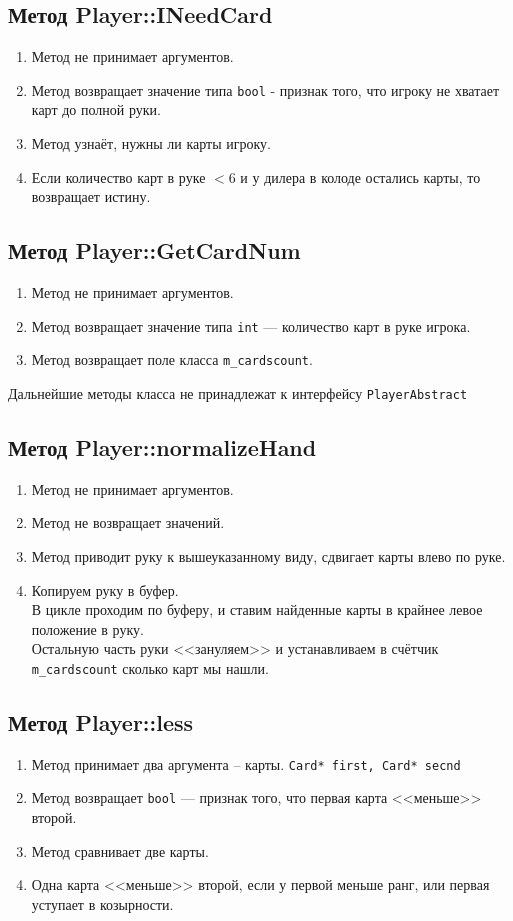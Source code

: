 \documentclass[a4paper,12pt]{article}
\begin{document}
		\subsection {Метод Player::INeedCard}
			\begin{enumerate}
				\item 	Метод не принимает аргументов.
				\item 	Метод возвращает значение типа \texttt{bool} - признак того, что игроку не хватает карт до полной руки.
				\item 	Метод узнаёт, нужны ли карты игроку.
				\item 	Если количество карт в руке $< 6$ и у дилера в колоде остались карты, то возвращает истину. 
			\end{enumerate}
		\subsection {Метод Player::GetCardNum}
			\begin{enumerate}
				\item 	Метод не принимает аргументов.
				\item 	Метод возвращает значение типа \texttt{int} --- количество карт в руке игрока.
				\item   Метод возвращает поле класса \texttt{m\_cardscount}.
			\end{enumerate}
		{\large Дальнейшие методы класса не принадлежат к интерфейсу \texttt{PlayerAbstract}}
		\subsection {Метод Player::normalizeHand}
			\begin{enumerate}
				\item 	Метод не принимает аргументов.
				\item 	Метод не возвращает значений.
				\item 	Метод приводит руку к вышеуказанному виду, сдвигает карты влево по руке.
				\item 	Копируем руку в буфер.\\
						В цикле проходим по буферу, и ставим найденные карты в крайнее левое положение в руку.\\
						Остальную часть руки <<зануляем>> и устанавливаем в счётчик \texttt{m\_cardscount} сколько карт мы нашли.
			\end{enumerate}
		\subsection {Метод Player::less}
			\begin{enumerate}
				\item 	Метод принимает два аргумента -- карты. \texttt{Card* first, Card* secnd}
				\item 	Метод возвращает \texttt{bool} --- признак того, что первая карта <<меньше>> второй.
				\item 	Метод сравнивает две карты.
				\item 	Одна карта <<меньше>> второй, если у первой меньше ранг, или первая уступает в козырности.
			\end{enumerate}
\end{document}
